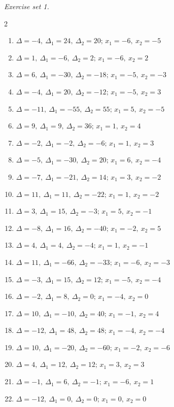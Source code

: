 \par\noindent\emph{Exercise set 1.}\nopagebreak
\begin{multicols}{2}\raggedright
\begin{enumerate}[label=\arabic*., leftmargin=*, itemsep=1pt]
\item $\Delta=-4,\ \Delta_1=24,\ \Delta_2=20;\,x_1=-6,\ x_2=-5$
\item $\Delta=1,\ \Delta_1=-6,\ \Delta_2=2;\,x_1=-6,\ x_2=2$
\item $\Delta=6,\ \Delta_1=-30,\ \Delta_2=-18;\,x_1=-5,\ x_2=-3$
\item $\Delta=-4,\ \Delta_1=20,\ \Delta_2=-12;\,x_1=-5,\ x_2=3$
\item $\Delta=-11,\ \Delta_1=-55,\ \Delta_2=55;\,x_1=5,\ x_2=-5$
\item $\Delta=9,\ \Delta_1=9,\ \Delta_2=36;\,x_1=1,\ x_2=4$
\item $\Delta=-2,\ \Delta_1=-2,\ \Delta_2=-6;\,x_1=1,\ x_2=3$
\item $\Delta=-5,\ \Delta_1=-30,\ \Delta_2=20;\,x_1=6,\ x_2=-4$
\item $\Delta=-7,\ \Delta_1=-21,\ \Delta_2=14;\,x_1=3,\ x_2=-2$
\item $\Delta=11,\ \Delta_1=11,\ \Delta_2=-22;\,x_1=1,\ x_2=-2$
\item $\Delta=3,\ \Delta_1=15,\ \Delta_2=-3;\,x_1=5,\ x_2=-1$
\item $\Delta=-8,\ \Delta_1=16,\ \Delta_2=-40;\,x_1=-2,\ x_2=5$
\item $\Delta=4,\ \Delta_1=4,\ \Delta_2=-4;\,x_1=1,\ x_2=-1$
\item $\Delta=11,\ \Delta_1=-66,\ \Delta_2=-33;\,x_1=-6,\ x_2=-3$
\item $\Delta=-3,\ \Delta_1=15,\ \Delta_2=12;\,x_1=-5,\ x_2=-4$
\item $\Delta=-2,\ \Delta_1=8,\ \Delta_2=0;\,x_1=-4,\ x_2=0$
\item $\Delta=10,\ \Delta_1=-10,\ \Delta_2=40;\,x_1=-1,\ x_2=4$
\item $\Delta=-12,\ \Delta_1=48,\ \Delta_2=48;\,x_1=-4,\ x_2=-4$
\item $\Delta=10,\ \Delta_1=-20,\ \Delta_2=-60;\,x_1=-2,\ x_2=-6$
\item $\Delta=4,\ \Delta_1=12,\ \Delta_2=12;\,x_1=3,\ x_2=3$
\item $\Delta=-1,\ \Delta_1=6,\ \Delta_2=-1;\,x_1=-6,\ x_2=1$
\item $\Delta=-12,\ \Delta_1=0,\ \Delta_2=0;\,x_1=0,\ x_2=0$

\end{enumerate}
\end{multicols}
